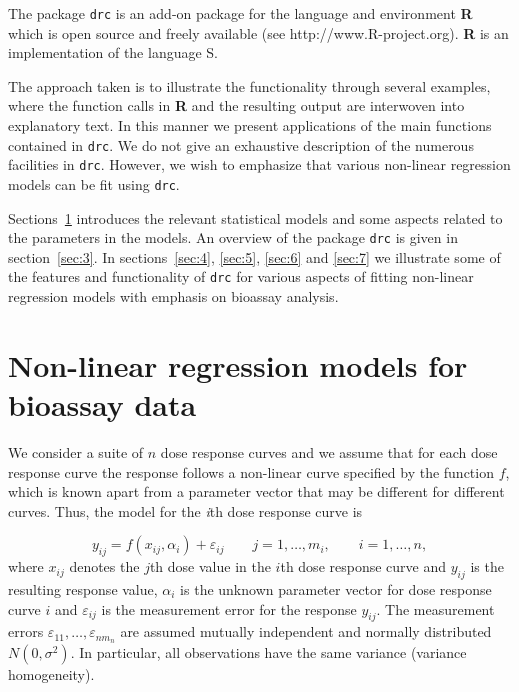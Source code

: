 \documentclass[a4paper]{article}
\begin{document}
The package \verb+drc+ is an add-on package
for the language and environment \textbf{R} \citep{r-lang} which
is open source and freely available (see
http://www.R-project.org). \textbf{R} is an implementation of the
language S.

The approach taken is to illustrate the functionality through
several examples, where the function calls in \textbf{R} and the resulting
output are interwoven into explanatory text. In this manner we present
applications of the main functions contained in \verb+drc+. We do
not give an exhaustive description of the numerous facilities in
\verb+drc+. However, we wish to emphasize that various non-linear regression
models can be fit using \verb+drc+.

Sections~\ref{sec:2} introduces the relevant statistical models and some aspects related to the parameters in the models. 
An overview of the package \verb+drc+ is given in section~\ref{sec:3}.
In sections~\ref{sec:4}, \ref{sec:5}, \ref{sec:6} and \ref{sec:7} we illustrate some of the features 
and functionality of \verb+drc+ for various aspects of fitting non-linear regression models with emphasis on bioassay analysis.


\section{Non-linear regression models for bioassay data} \label{sec:2}

We consider a suite of $n$ dose response curves and we assume
that for each dose response curve the response follows a non-linear curve
specified by the function $f$, which is known apart from a
parameter vector that may be different for different curves. Thus, the model for the \emph{i}th dose response
curve is

\[ 
y_{ij} = f (x_{ij}, \alpha_i) + \varepsilon_{ij} \qquad j=1, \ldots, m_i, \qquad i=1, \ldots, n, 
\]
where $x_{ij}$ denotes the $j$th dose value in the $i$th dose response curve and $y_{ij}$ is the resulting response value, $\alpha_i$ is the 
unknown parameter vector for dose response curve $i$ and
$\varepsilon_{ij}$ is the measurement error for the response $y_{ij}$. The measurement
errors $\varepsilon_{11}, \ldots, \varepsilon_{n m_n}$ are
assumed mutually independent and normally distributed $N(0,
\sigma^2)$. In particular, all observations have the same variance
(variance homogeneity).
\end{document}
